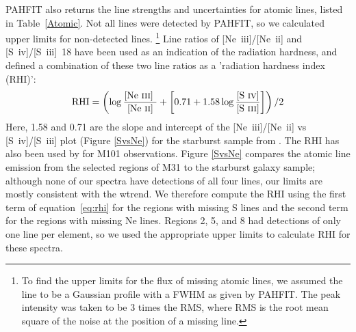 PAHFIT also returns the line strengths and uncertainties for atomic lines, listed in Table~\ref{Atomic}.
Not all lines were detected by PAHFIT, so we calculated upper limits for non-detected lines.%
\footnote{To find  the upper limits for the flux of missing atomic lines, we assumed the line to be a 
Gaussian profile with a FWHM as given by PAHFIT. The peak intensity was taken to be 3 times the RMS, where RMS is the root mean square of 
the noise at the position of a missing line.}
Line ratios of [Ne~{\sc iii}]/[Ne~{\sc ii}] and [S~{\sc iv}]/[S~{\sc iii}]~18 have been used as an indication of the radiation hardness, and
\citet{Engelbracht_2008} defined a combination of these two line ratios as a 'radiation hardness index (RHI)':
%
\begin{equation}
{\rm RHI} = \left( \log\frac{\textrm{[Ne~{\sc iii}] }}{\textrm{[Ne~{\sc ii}]}} + \left[0.71 + 1.58\log\frac{\textrm{{[S~{\sc iv}]}}}{\textrm{{[S~{\sc iii}]}}}\right]\right) /2
\end{equation}
\label{eq:rhi}
%
Here, 1.58 and 0.71 are the slope and intercept of the [Ne~{\sc iii}]/[Ne~{\sc ii}]  vs [S~{\sc iv}]/[S~{\sc iii}] plot (Figure \ref{SvsNe}) for the starburst sample from 
\citet{Engelbracht_2008}. The RHI has also been used by \citet{Gordon:2008lr} for M101 observations. 
Figure \ref{SvsNe}  compares the atomic line emission from the selected regions of M31 to the starburst galaxy sample;
although none of our spectra have detections of all four lines, our limits are mostly consistent with the wtrend.
We therefore compute the RHI using the first term of equation~\ref{eq:rhi} for the regions with missing S lines
and the second term for the regions with missing Ne lines.
Regions 2, 5, and 8 had detections of only one line per element, so we used the appropriate upper limits 
to calculate RHI for these spectra.


